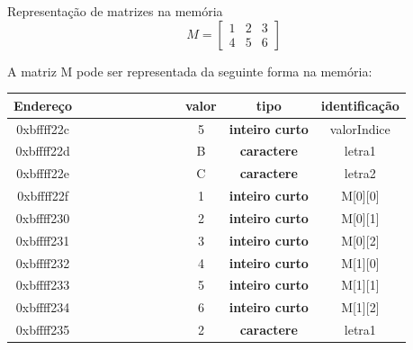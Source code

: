 \documentclass[portuguese,10pt,xcolor=table]{bredelebeamer}
\begin{document}
	\begin{frame}{Representação de matrizes na memória}
				$$
				M = \begin{bmatrix}
					1 & 2 & 3 \\[0.3em]
					4 & 5 & 6
				\end{bmatrix}
				$$

		A matriz M pode ser representada da seguinte forma na memória:
		\tiny
		 \setlength{\tabcolsep}{0pt}	
		\begin{table}
				  \begin{tabular}{|@{\hskip 0.2cm}c@{\hskip 0.2cm}|c|c|c|c|c|c|c|c|c|c|@{\hskip 0.2cm}c@{\hskip 0.2cm}|}
					\hline
					  \textbf{Endereço} & & & & & & & & & \textbf{valor} & \textbf{tipo} & \textbf{identificação}\\\hline
					  0xbffff22c & \GN[0]&\GN[0]&\GN[0]&\GN[0]&\GN[0]&\GN[1]&\GN[0]&\GN[1]& 5 & \textbf{inteiro curto} & valorIndice\\\hline
					  0xbffff22d & \BN[0]&\BN[1]&\BN[0]&\BN[0]&\BN[0]&\BN[0]&\BN[1]&\BN[0]& B & \textbf{caractere} & letra1\\\hline
					  0xbffff22e & \BN[0]&\BN[1]&\BN[0]&\BN[0]&\BN[0]&\BN[0]&\BN[1]&\BN[1]& C & \textbf{caractere} & letra2\\\hline
					  0xbffff22f & \GN[0]&\GN[0]&\GN[0]&\GN[0]&\GN[0]&\GN[0]&\GN[0]&\GN[1]& 1 & \textbf{inteiro curto} & M[0][0]\\\hline
					  0xbffff230 & \GN[0]&\GN[0]&\GN[0]&\GN[0]&\GN[0]&\GN[0]&\GN[1]&\GN[0]& 2 & \textbf{inteiro curto} & M[0][1]\\\hline
					  0xbffff231 & \GN[0]&\GN[0]&\GN[0]&\GN[0]&\GN[0]&\GN[0]&\GN[1]&\GN[1]& 3 & \textbf{inteiro curto} & M[0][2]\\\hline
					  0xbffff232 & \GN[0]&\GN[0]&\GN[0]&\GN[0]&\GN[0]&\GN[1]&\GN[0]&\GN[0]& 4 & \textbf{inteiro curto} & M[1][0]\\\hline
					  0xbffff233 & \GN[0]&\GN[0]&\GN[0]&\GN[0]&\GN[0]&\GN[1]&\GN[0]&\GN[1]& 5 & \textbf{inteiro curto} & M[1][1]\\\hline
					  0xbffff234 & \GN[0]&\GN[0]&\GN[0]&\GN[0]&\GN[0]&\GN[1]&\GN[1]&\GN[0]& 6 & \textbf{inteiro curto} & M[1][2]\\\hline
					  0xbffff235 & \BN[0]&\BN[0]&\BN[1]&\BN[1]&\BN[0]&\BN[0]&\BN[1]&\BN[0]& 2 & \textbf{caractere} & letra1\\\hline
				\end{tabular}
		\end{table}
		\normalsize
	\end{frame}
\end{document}
